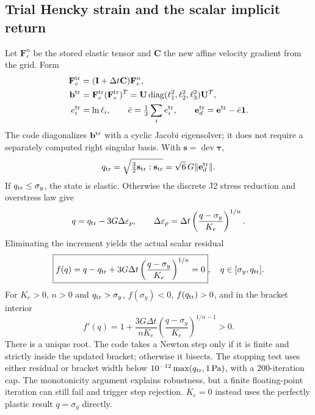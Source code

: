 \subsection{Trial Hencky strain and the scalar implicit return}
Let $\mathbf F_e^n$ be the stored elastic tensor and $\mathbf C$ the new affine
velocity gradient from the grid. Form
\begin{align}
 \mathbf F_e^{\rm tr}&=(\mathbf I+\Delta t\mathbf C)\mathbf F_e^n,\\
 \mathbf b^{\rm tr}&=\mathbf F_e^{\rm tr}(\mathbf F_e^{\rm tr})^T
   =\mathbf U\operatorname{diag}(\ell_1^2,\ell_2^2,\ell_3^2)\mathbf U^T,\\
 e_i^{\rm tr}&=\ln\ell_i,\qquad
 \bar e=\tfrac13\sum_i e_i^{\rm tr},\qquad
 \mathbf e_d^{\rm tr}=\mathbf e^{\rm tr}-\bar e\mathbf 1.
 \label{eq:hencky-trial}
\end{align}
The code diagonalizes $\mathbf b^{\rm tr}$ with a cyclic Jacobi eigensolver;
it does not require a separately computed right singular basis. With
$\mathbf s=\operatorname{dev}\boldsymbol\tau$,
\begin{equation}
 q_{\rm tr}=\sqrt{\tfrac32\mathbf s_{\rm tr}:\mathbf s_{\rm tr}}
           =\sqrt{6}\,G\|\mathbf e_d^{\rm tr}\|.
\end{equation}
If $q_{\rm tr}\leq\sigma_y$, the state is elastic. Otherwise the discrete J2
stress reduction and overstress law give
\begin{equation}
 q=q_{\rm tr}-3G\Delta\varepsilon_p,\qquad
 \Delta\varepsilon_p=\Delta t
       \left(\frac{q-\sigma_y}{K_e}\right)^{1/n}.
\end{equation}
Eliminating the increment yields the actual scalar residual
\begin{equation}
 \boxed{f(q)=q-q_{\rm tr}+3G\Delta t
       \left(\frac{q-\sigma_y}{K_e}\right)^{1/n}=0},
 \quad q\in[\sigma_y,q_{\rm tr}]. \label{eq:hb-return}
\end{equation}
For $K_e>0$, $n>0$ and $q_{\rm tr}>\sigma_y$,
$f(\sigma_y)<0$, $f(q_{\rm tr})>0$, and in the bracket interior
\begin{equation}
 f'(q)=1+\frac{3G\Delta t}{nK_e}
       \left(\frac{q-\sigma_y}{K_e}\right)^{1/n-1}>0.
\end{equation}
There is a unique root. The code takes a Newton step only if it is finite and
strictly inside the updated bracket; otherwise it bisects. The stopping test
uses either residual or bracket width below
$10^{-12}\max(q_{\rm tr},\SI{1}{Pa})$, with a 200-iteration cap.
The monotonicity argument explains robustness, but a finite floating-point
iteration can still fail and trigger step rejection. $K_e=0$ instead uses the
perfectly plastic result $q=\sigma_y$ directly.


